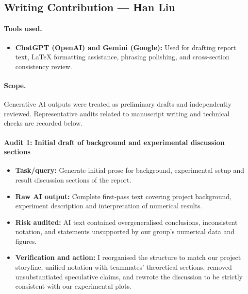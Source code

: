 \subsection*{Writing Contribution --- Han Liu}
\paragraph{Tools used.}
\begin{itemize}[leftmargin=1.5em, itemsep=2pt]
    \item \textbf{ChatGPT (OpenAI) and Gemini (Google):} Used for drafting report text, LaTeX formatting assistance, phrasing polishing, and cross-section consistency review.
\end{itemize}

\paragraph{Scope.}
Generative AI outputs were treated as preliminary drafts and independently reviewed. Representative audits related to manuscript writing and technical checks are recorded below.

\paragraph{Audit 1: Initial draft of background and experimental discussion sections}
\begin{itemize}[leftmargin=1.5em, itemsep=2pt]
    \item \textbf{Task/query:} Generate initial prose for background, experimental setup and result discussion sections of the report.
    \item \textbf{Raw AI output:} Complete first-pass text covering project background, experiment description and interpretation of numerical results.
    \item \textbf{Risk audited:} AI text contained overgeneralised conclusions, inconsistent notation, and statements unsupported by our group’s numerical data and figures.
    \item \textbf{Verification and action:} I reorganised the structure to match our project storyline, unified notation with teammates’ theoretical sections, removed unsubstantiated speculative claims, and rewrote the discussion to be strictly consistent with our experimental plots.
\end{itemize}

